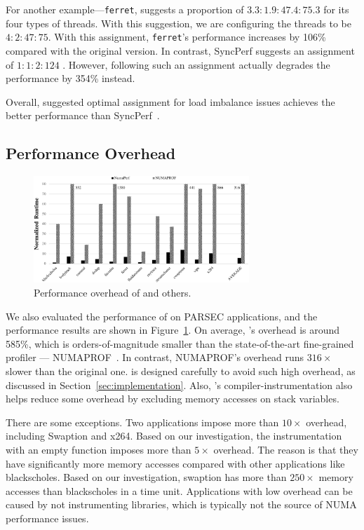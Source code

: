 For another example---\texttt{ferret}, \NP{} suggests a proportion of $3.3 :1.9 :47.4 :75.3$ for its four types of threads. With this suggestion, we are configuring the threads to be $4 : 2 : 47 : 75$. With this assignment, \texttt{ferret}'s performance increases by 106\% compared with the original version. In contrast, SyncPerf suggests an assignment of $1:1:2:124$
. However, following such an assignment  actually degrades the performance by 354\% instead. 

Overall, \NP{} suggested optimal assignment for load imbalance issues achieves the better performance than SyncPerf~\cite{SyncPerf}. 

\subsection{Performance Overhead}
\label{sec:performance}
\begin{figure}[!h]
    \centering
    \includegraphics[width=3.2in]{paper/figures/performance.pdf}
    \caption{Performance overhead of \NP{} and others.\label{fig:performance}}  
\end{figure}


We also evaluated the performance of \NP{} on PARSEC applications, and the performance results are shown in Figure~\ref{fig:performance}. On average, \NP{}'s overhead is around 585\%, which is orders-of-magnitude smaller than the state-of-the-art fine-grained profiler --- NUMAPROF~\cite{valat:2018:numaprof}. In contrast, NUMAPROF's overhead runs $316\times$ slower than the original one. \NP{} is designed carefully to avoid such high overhead, as discussed in Section~\ref{sec:implementation}. Also, \NP{}'s compiler-instrumentation also helps reduce some overhead by excluding memory accesses on stack variables. 

There are some exceptions. Two applications impose more than $10\times$ overhead, including Swaption and x264. Based on our investigation, the instrumentation with an empty function imposes more than $5\times$ overhead. The reason is that they have significantly more  memory accesses compared with other applications like blackscholes. Based on our investigation, swaption has more than $250\times$ memory accesses than  blackscholes in a time unit. Applications with low overhead can be caused by not instrumenting libraries, which is typically not the source of NUMA performance issues. 

